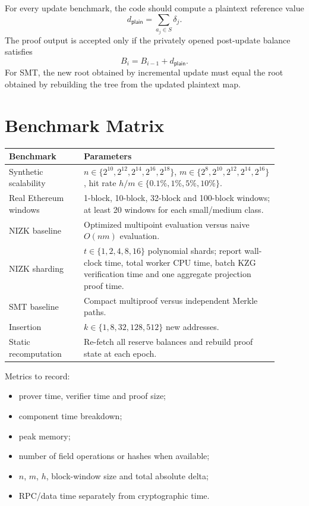 \documentclass[UTF8,a4paper,11pt]{ctexart}
\begin{document}
For every update benchmark, the code should compute a plaintext reference value
\[
  d_{\mathsf{plain}}=\sum_{a_j\in S}\delta_j.
\]
The proof output is accepted only if the privately opened post-update balance satisfies
\[
  B_i=B_{i-1}+d_{\mathsf{plain}}.
\]
For SMT, the new root obtained by incremental update must equal the root obtained by rebuilding the tree from the updated plaintext map.

\section{Benchmark Matrix}

\begin{longtable}{p{0.25\linewidth}p{0.65\linewidth}}
\toprule
Benchmark & Parameters \\
\midrule
Synthetic scalability & $n\in\{2^{10},2^{12},2^{14},2^{16},2^{18}\}$, $m\in\{2^8,2^{10},2^{12},2^{14},2^{16}\}$, hit rate $h/m\in\{0.1\%,1\%,5\%,10\%\}$. \\
Real Ethereum windows & 1-block, 10-block, 32-block and 100-block windows; at least 20 windows for each small/medium class. \\
NIZK baseline & Optimized multipoint evaluation versus naive $O(nm)$ evaluation. \\
NIZK sharding & $t\in\{1,2,4,8,16\}$ polynomial shards; report wall-clock time, total worker CPU time, batch KZG verification time and one aggregate projection proof time. \\
SMT baseline & Compact multiproof versus independent Merkle paths. \\
Insertion & $k\in\{1,8,32,128,512\}$ new addresses. \\
Static recomputation & Re-fetch all reserve balances and rebuild proof state at each epoch. \\
\bottomrule
\end{longtable}

Metrics to record:
\begin{itemize}[leftmargin=2em]
  \item prover time, verifier time and proof size;
  \item component time breakdown;
  \item peak memory;
  \item number of field operations or hashes when available;
  \item $n$, $m$, $h$, block-window size and total absolute delta;
  \item RPC/data time separately from cryptographic time.
\end{itemize}
\end{document}
